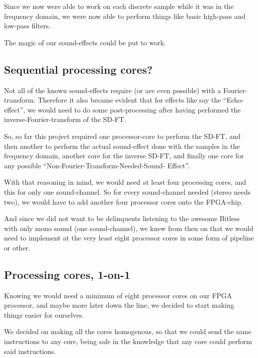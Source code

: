 Since we now were able to work on each discrete sample while it was in the
frequency domain, we were now able to perform things like basic high-pass and
low-pass filters.

The magic of our sound-effects could be put to work.

\FloatBarrier
\subsection{Sequential processing cores?}

Not all of the known sound-effects require (or are even possible) with a
Fourier-transform. Therefore it also became evident that for effects like say
the ``Echo-effect'', we would need to do some post-processing after having
performed the inverse-Fourier-transform of the 
SD-FT.

So, so far this project required one processor-core to perform the SD-FT, and
then another to perform the actual sound-effect done with the samples in the
frequency domain, another core for the inverse SD-FT, and finally one core for
any possible ``Non-Fourier-Transform-Needed-Sound-
Effect''.

With that reasoning in mind, we would need at least four processing cores, and
this for only one sound-channel. So for every sound-channel needed (stereo needs
two), we would have to add another four processor cores onto the FPGA-chip.

And since we did not want to be delinquents listening to the awesome 
Bitless with only mono sound (one sound-channel), we knew from then on that we
would need to implement at the very least eight processor cores in some form of
pipeline or other.

\FloatBarrier
\subsection{Processing cores, 1-on-1}

Knowing we would need a minimum of eight processor cores on our FPGA processor,
and maybe more later down the line, we decided to start making things easier
for ourselves.

We decided on making all the cores homogenous, so that we could send the same
instructions to any core, being safe in the knowledge that any core could
perform said instructions.

